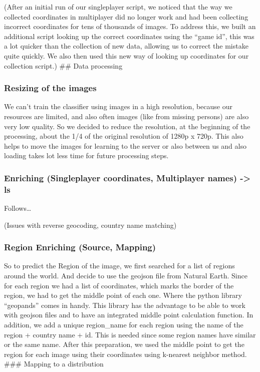 \documentclass{article}
\begin{document}
(After an initial run of our singleplayer script, we noticed that the
way we collected coordinates in multiplayer did no longer work and had
been collecting incorrect coordinates for tens of thousands of images.
To address this, we built an additional script looking up the correct
coordinates using the ``game id'', this was a lot quicker than the
collection of new data, allowing us to correct the mistake quite
quickly. We also then used this new way of looking up coordinates for
our collection script.) \#\# Data processing

\subsubsection{Resizing of the images}\label{resizing-of-the-images}

We can't train the classifier using images in a high resolution, because
our resources are limited, and also often images (like from missing
persons) are also very low quality. So we decided to reduce the
resolution, at the beginning of the processing, about the 1/4 of the
original resolution of 1280p x 720p. This also helps to move the images
for learning to the server or also between us and also loading takes lot
less time for future processing steps.

\subsubsection{Enriching (Singleplayer coordinates, Multiplayer names)
-\textgreater{}
ls}\label{enriching-singleplayer-coordinates-multiplayer-names---ls}

Follows\ldots{}

(Issues with reverse geocoding, country name matching)

\subsubsection{Region Enriching (Source,
Mapping)}\label{region-enriching-source-mapping}

So to predict the Region of the image, we first searched for a list of
regions around the world. And decide to use the geojson file from
Natural Earth. Since for each region we had a list of coordinates, which
marks the border of the region, we had to get the middle point of each
one. Where the python library ``geopands'' comes in handy. This library
has the advantage to be able to work with geojson files and to have an
integrated middle point calculation function. In addition, we add a
unique region\_name for each region using the name of the region +
country name + id. This is needed since some region names have similar
or the same name. After this preparation, we used the middle point to
get the region for each image using their coordinates using k-nearest
neighbor method. \#\#\# Mapping to a distribution
\end{document}
